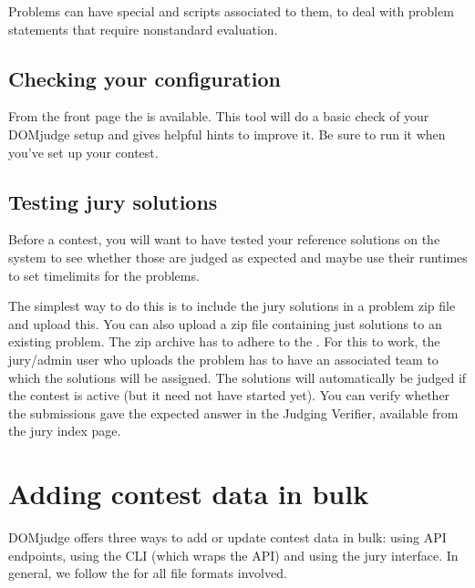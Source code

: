 \documentclass[a4paper,10pt,english,openany]{sphinxmanual}
\begin{document}
\sphinxAtStartPar
Problems can have special  and
 scripts associated to them, to deal with problem
statements that require non\sphinxhyphen{}standard evaluation.


\subsection{Checking your configuration}
\label{\detokenize{config-basic:checking-your-configuration}}
\sphinxAtStartPar
From the front page the  is available. This tool will
do a basic check of your DOMjudge setup and gives helpful hints to
improve it. Be sure to run it when you’ve set up your contest.


\subsection{Testing jury solutions}
\label{\detokenize{config-basic:testing-jury-solutions}}
\sphinxAtStartPar
Before a contest, you will want to have tested your reference
solutions on the system to see whether those are judged as expected
and maybe use their runtimes to set timelimits for the problems.

\sphinxAtStartPar
The simplest way to do this is to include the jury solutions in a
problem zip file and upload this. You can also upload a zip file
containing just solutions to an existing problem. The zip
archive has to adhere to the {\hyperref[\detokenize{problem-format::doc}]{}}.
For this to work, the jury/admin user who uploads the problem has to
have an associated team to which the solutions will be assigned. The
solutions will automatically be judged if the contest is active (but
it need not have started yet). You can verify whether the submissions
gave the expected answer in the Judging Verifier, available from
the jury index page.

\sphinxstepscope


\section{Adding contest data in bulk}
\label{\detokenize{import:adding-contest-data-in-bulk}}\label{\detokenize{import::doc}}
\sphinxAtStartPar
DOMjudge offers three ways to add or update contest data in bulk: using API
endpoints, using the CLI (which wraps the API) and using the jury interface.
In general, we follow the  for all file formats involved.
\end{document}
